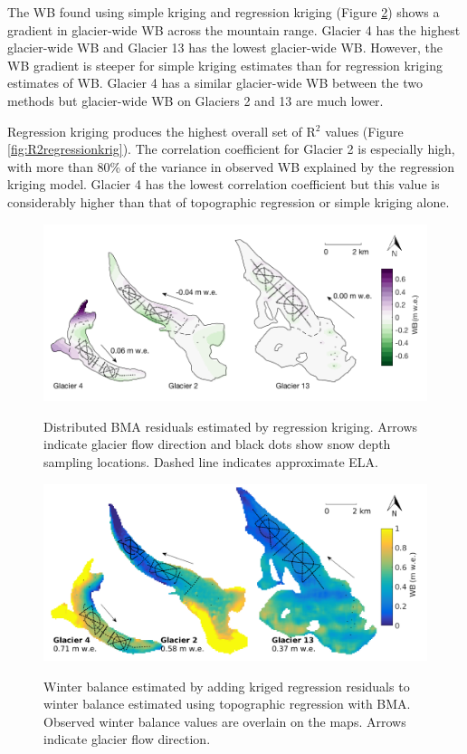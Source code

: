 \documentclass{sfuthesis}
\newcommand{\topomap}{Arrows indicate glacier flow direction and black dots show snow depth sampling locations. }
\newcommand{\swedots}{Observed winter balance values are overlain on the maps. }
\begin{document}
The WB found using simple kriging and regression kriging (Figure \ref{fig:Regression-Kriging}) shows a gradient in glacier-wide WB across the mountain range. Glacier 4 has the highest glacier-wide WB and Glacier 13 has the lowest glacier-wide WB. However, the WB gradient is steeper for simple kriging estimates than for regression kriging estimates of WB. Glacier 4 has a similar glacier-wide WB between the two methods but glacier-wide WB on Glaciers 2 and 13 are much lower.  

Regression kriging produces the highest overall set of R$^2$ values (Figure \ref{fig:R2regressionkrig}). The correlation coefficient for Glacier 2 is especially high, with more than 80\% of the variance in observed WB explained by the regression kriging model. Glacier 4 has the lowest correlation coefficient but this value is considerably higher than that of topographic regression or simple kriging alone. 

\begin{figure}
	\centering
	\includegraphics[width = \textwidth]{residualsKriged.png}\\
	\caption{Distributed BMA residuals estimated by regression kriging.  \topomap Dashed line indicates approximate ELA.}
	\label{fig:residualsKRIGING}
\end{figure}

\begin{figure}
	\centering
	\includegraphics[width = \textwidth]{RegressionKriging.png}\\
	\caption{Winter balance estimated by adding kriged regression residuals to winter balance estimated using topographic regression with BMA. \swedots Arrows indicate glacier flow direction.}
	\label{fig:Regression-Kriging}
\end{figure}
\end{document}
